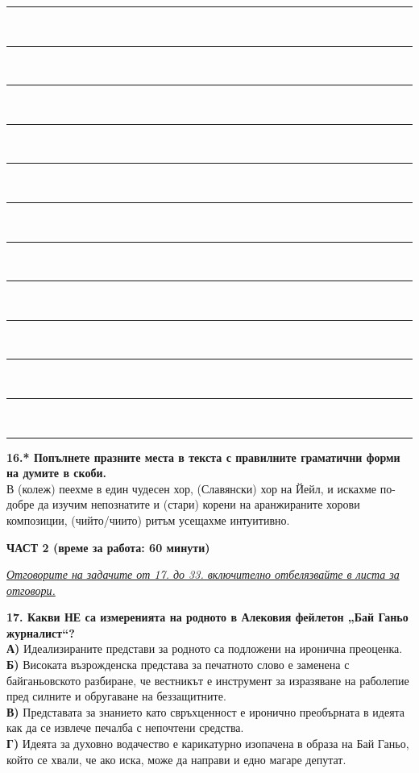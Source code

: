 \documentclass[12pt,a4paper]{article}
\begin{document}
\vspace{0.6cm}
{\noindent\rule{\linewidth}{0.4pt} \\
{\noindent\rule{\linewidth}{0.4pt} \\
{\noindent\rule{\linewidth}{0.4pt} \\
{\noindent\rule{\linewidth}{0.4pt} \\
{\noindent\rule{\linewidth}{0.4pt} \\
{\noindent\rule{\linewidth}{0.4pt} \\
{\noindent\rule{\linewidth}{0.4pt} \\
{\noindent\rule{\linewidth}{0.4pt} \\
{\noindent\rule{\linewidth}{0.4pt} \\
{\noindent\rule{\linewidth}{0.4pt} \\
{\noindent\rule{\linewidth}{0.4pt} \\
{\noindent\rule{\linewidth}{0.4pt} 


\vspace{0.6cm}

\noindent
\textbf{16.* Попълнете празните места в текста с правилните граматични форми на думите в скоби.} \\
В \makebox[3cm]{\dotfill} (колеж) пеехме в един чудесен хор, \makebox[4cm]{\dotfill} (Славянски) хор на Йейл, и искахме по-добре да изучим непознатите и \makebox[3cm]{\dotfill} (стари) корени на аранжираните хорови композиции, \makebox[3cm]{\dotfill} (чийто/чиито) ритъм усещахме интуитивно.

\newpage

\vspace{0.6cm}

\noindent
\textbf{ЧАСТ 2 (време за работа: 60 минути)}

\vspace{0.3cm}

\noindent
\underline{\textit{Отговорите на задачите от 17. до 33. включително отбелязвайте в листа за отговори.}}

\vspace{0.5cm}

\noindent
\textbf{17. Какви НЕ са измеренията на родното в Алековия фейлетон „Бай Ганьо журналист“?} \\
\textbf{А)} Идеализираните представи за родното са подложени на иронична преоценка. \\
\textbf{Б)} Високата възрожденска представа за печатното слово е заменена с байганьовското разбиране, че вестникът е инструмент за изразяване на раболепие пред силните и обругаване на беззащитните. \\
\textbf{В)} Представата за знанието като свръхценност е иронично преобърната в идеята как да се извлече печалба с непочтени средства. \\
\textbf{Г)} Идеята за духовно водачество е карикатурно изопачена в образа на Бай Ганьо, който се хвали, че ако иска, може да направи и едно магаре депутат.

}}}}}}}}}}}}
\end{document}
